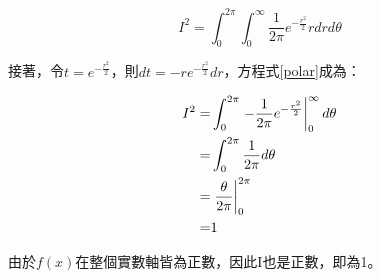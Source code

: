 \documentclass{article}
\newcommand\rsx[1]{\left.{#1}\vphantom{\big|}\right|}
\begin{document}
\begin{equation}\label{polar}
I^2=\int_{0}^{2\pi}\int_{0}^{\infty}\frac{1}{2\pi}e^{-\frac{r^2}{2}}rdrd\theta
\end{equation}

接著，令$t=e^{-\frac{r^2}{2}}$，則$dt=-re^{-\frac{r^2}{2}}dr$，方程式\ref{polar}成為：

\begin{equation}
\begin{aligned}
I^2
=&\int_{0}^{2\pi}\rsx{-\frac{1}{2\pi}e^{-\frac{r^2}{2}}}_{0}^{\infty}d\theta\\
=&\int_{0}^{2\pi}\frac{1}{2\pi}d\theta\\
=&\rsx{\frac{\theta}{2\pi}}_{0}^{2\pi}\\
=&1
\end{aligned}
\end{equation}

由於$f(x)$在整個實數軸皆為正數，因此I也是正數，即為1。
\end{document}

